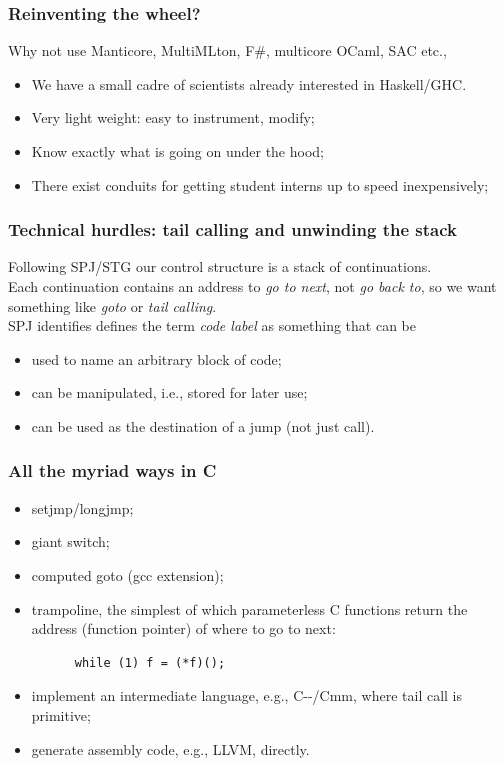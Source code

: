 \documentclass{beamer}
\begin{document}
\begin{frame}
\frametitle{Reinventing the wheel?}  Why not use Manticore, MultiMLton, F\#,
multicore OCaml, SAC etc., 
\begin{itemize}
  \item<2-> We have a small cadre of scientists already interested in Haskell/GHC.
  \item<3-> Very light weight:  easy to instrument, modify;
  \item<4-> Know exactly what is going on under the hood;
  \item<5-> There exist conduits for getting student interns up to speed inexpensively;
\end{itemize}
\end{frame}


\begin{frame}
\frametitle{Technical hurdles:  tail calling and unwinding the stack}
Following SPJ/STG our control structure is a stack of continuations.  
\\\vspace{0.1in}
Each continuation contains an address to \emph{go to next}, not \emph{go back
  to}, so we want something like \emph{goto} or \emph{tail calling}.
\\\vspace{0.1in}
SPJ identifies defines the term \emph{code label} as something that can be
\begin{itemize}
  \item used to name an arbitrary block of code;
  \item can be manipulated, i.e., stored for later use;
  \item can be used as the destination of a jump (not just call).
\end{itemize}
\end{frame}


\begin{frame}[fragile] %
\frametitle{All the myriad ways in C}
\begin{itemize}
\item<1-> setjmp/longjmp;
\item<2-> giant switch;
\item<3-> computed goto (gcc extension);
\item<4-> trampoline, the simplest of which parameterless C functions return the
  address (function pointer) of where to go to next:
\begin{verbatim}
      while (1) f = (*f)();
\end{verbatim}
\item<5-> implement an intermediate language, e.g., C-{}-/Cmm, where tail call is primitive;
\item<6-> generate assembly code, e.g., LLVM, directly.
\end{itemize}
\end{frame}
\end{document}
